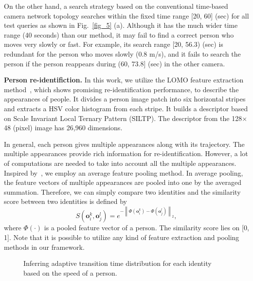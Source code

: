 \documentclass[10pt,twocolumn,letterpaper]{article}
\begin{document}
	On the other hand, a search strategy based on the conventional time-based camera network topology searches within the fixed time range [20, 60] (sec) for all test queries as shown in Fig.~\ref{fig_5} (a). Although it has the much wider time range (40 seconds) than our method, it may fail to find a correct person who moves very slowly or fast.
	For example, its search range [20, 56.3) (sec) is redundant for the person who moves slowly (0.8 m/s), and it fails to search the person if the person reappears during (60, 73.8] (sec) in the other camera. 
	
	
	\vspace{3pt}
	
	\noindent \textbf{Person re-identifiction.} 
	In this work, we utilize the LOMO feature extraction method~\cite{liao2015person}, which shows promising re-identification performance, to describe the appearances of people.
	It divides a person image patch into six horizontal stripes and extracts a HSV color histogram from each stripe. It builds a descriptor based on Scale Invariant Local Ternary Pattern (SILTP). The descriptor from the 128$\times$48 (pixel) image has 26,960 dimensions.
	
	In general, each person gives multiple appearances along with its trajectory. The multiple appearances provide rich information for re-identification. However, a lot of computations are needed to take into account all the multiple appearances.
	Inspired by~\cite{zheng2015scalable}, we employ an average feature pooling method. In average pooling, the feature vectors of multiple appearances are pooled into one by the averaged summation. Therefore, we can simply compare two identities and the similarity score between two identities is defined by 
	\begin{equation}
	S\left(\mathbf{o}^k_i,\mathbf{o}^l_j\right) = {e}^{-\left\|  \Phi \left(\mathbf{o}^k_i\right) - \Phi \left(\mathbf{o}^l_j\right) \right\|_2},
	\end{equation}		
	where $\Phi\left(\cdot \right)$ is a pooled feature vector of a person. The similarity score lies on [0, 1].
	Note that it is possible to utilize any kind of feature extraction and pooling methods in our framework.	
	
	\begin{figure}[t]	
		\centering
		\caption{Inferring adaptive transition time distribution for each identity based on the speed of a person.}
		\label{fig_6}
	\end{figure}
	
\end{document}
